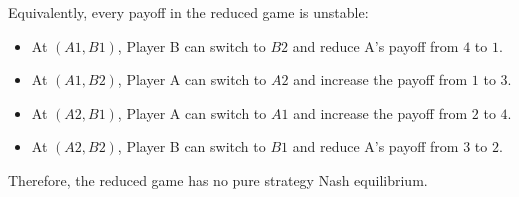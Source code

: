 \documentclass[11pt]{article}
\begin{document}
\begin{enumerate}
{Equivalently, every payoff in the reduced game is unstable:
\begin{itemize}
    \item At $(A1,B1)$, Player B can switch to $B2$ and reduce A's payoff from $4$ to $1$.
    \item At $(A1,B2)$, Player A can switch to $A2$ and increase the payoff from $1$ to $3$.
    \item At $(A2,B1)$, Player A can switch to $A1$ and increase the payoff from $2$ to $4$.
    \item At $(A2,B2)$, Player B can switch to $B1$ and reduce A's payoff from $3$ to $2$.
\end{itemize}
Therefore, the reduced game has no pure strategy Nash equilibrium.
}

\vspace{1em}



\end{enumerate}
\end{document}
